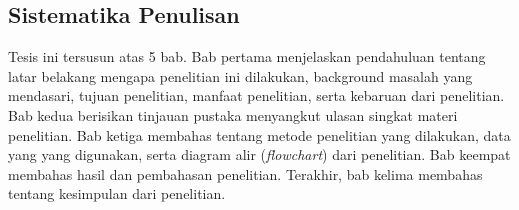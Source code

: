 \begin{spacing}{1.5}
	\section[Sistematika Penulisan]{Sistematika Penulisan}

	Tesis ini tersusun atas 5 bab. Bab pertama menjelaskan pendahuluan tentang latar belakang mengapa penelitian ini dilakukan, background masalah yang mendasari, tujuan penelitian, manfaat penelitian, serta kebaruan dari penelitian. Bab kedua berisikan tinjauan pustaka menyangkut ulasan singkat materi penelitian. Bab ketiga membahas tentang metode penelitian yang dilakukan, data yang yang digunakan, serta diagram alir (\textit{flowchart}) dari penelitian. Bab keempat membahas hasil dan pembahasan penelitian. Terakhir, bab kelima membahas tentang kesimpulan dari penelitian.
	
\end{spacing}